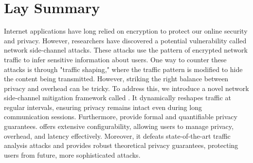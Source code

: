 

\chapter{Lay Summary}
Internet applications have long relied on encryption to protect our online security and privacy. However, researchers have discovered a potential vulnerability called network side-channel attacks. These attacks use the pattern of encrypted network traffic to infer sensitive information about users.
One way to counter these attacks is through "traffic shaping," where the traffic pattern is modified to hide the content being transmitted. However, striking the right balance between privacy and overhead can be tricky. To address this, we introduce a novel network side-channel mitigation framework called {\sys}. It dynamically reshapes traffic at regular intervals, ensuring privacy remains intact even during long communication sessions.
Furthermore, {\sys} provide formal and quantifiable privacy guarantees. 
{\sys} offers extensive configurability, allowing users to manage privacy, overhead, and latency effectively. Moreover, it defeats state-of-the-art traffic analysis attacks and provides robust theoretical privacy guarantees, protecting users from future, more sophisticated attacks.
